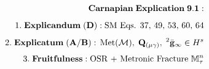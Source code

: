 \documentclass[preview]{standalone}
\begin{document}
\begin{align*}
\special{dvisvgm:raw <g id='unique000'>}\mathbf{Carnapian\;Explication\;9.1:}\\[5pt]1.\;\mathbf{Explicandum\;(D):}\;\text{SM Eqs. 37, 49, 53, 60, 64}\\[4pt]2.\;\mathbf{Explicatum\;(A/B):}\;\operatorname{Met}(\mathcal{M}),\;\mathbf{Q}_{(\mu\gamma)},\;{}^2\bar{\mathbf{g}}_\infty\in H^s\\[4pt]3.\;\mathbf{Fruitfulness:}\;\text{OSR + Metronic Fracture }\mathbb{M}_\tau^n\special{dvisvgm:raw </g>}
\end{align*}
\end{document}
